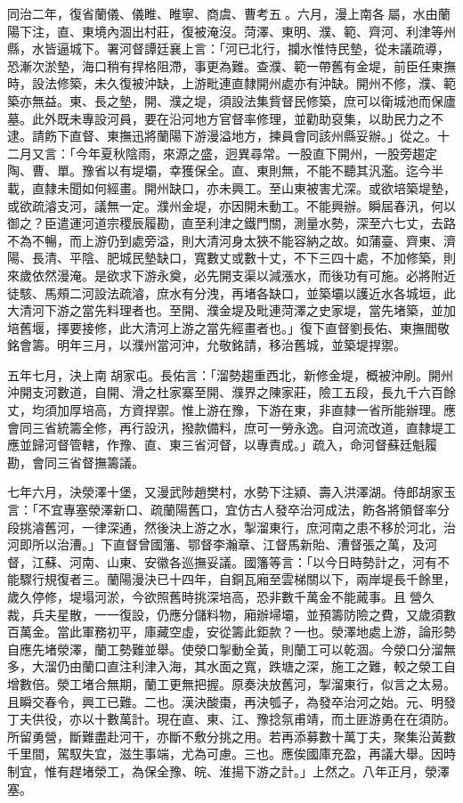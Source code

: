 \begin{pinyinscope}
同治二年，復省蘭儀、儀睢、睢寧、商虞、曹考五。六月，漫上南各屬，水由蘭陽下注，直、東境內涸出村莊，復被淹沒。菏澤、東明、濮、範、齊河、利津等州縣，水皆逼城下。署河督譚廷襄上言：「河已北行，攔水惟恃民墊，從未議疏導，恐漸次淤墊，海口稍有捍格阻滯，事更為難。查濮、範一帶舊有金堤，前臣任東撫時，設法修築，未久復被沖缺，上游毗連直隸開州處亦有沖缺。開州不修，濮、範築亦無益。東、長之墊，開、濮之堤，須設法集貲督民修築，庶可以衛城池而保廬墓。此外既未專設河員，要在沿河地方官督率修理，並勸助裒集，以助民力之不逮。請飭下直督、東撫迅將蘭陽下游漫溢地方，揀員會同該州縣妥辦。」從之。十二月又言：「今年夏秋陰雨，來源之盛，迥異尋常。一股直下開州，一股旁趨定陶、曹、單。豫省以有堤壩，幸獲保全。直、東則無，不能不聽其汎濫。迄今半載，直隸未聞如何經畫。開州缺口，亦未興工。至山東被害尤深。或欲培築堤墊，或欲疏濬支河，議無一定。濮州金堤，亦因開未動工。不能興辦。瞬屆春汛，何以御之？臣遣運河道宗稷辰履勘，直至利津之鐵門關，測量水勢，深至六七丈，去路不為不暢，而上游仍到處旁溢，則大清河身太狹不能容納之故。如蒲臺、齊東、濟陽、長清、平陰、肥城民墊缺口，寬數丈或數十丈，不下三四十處，不加修築，則來歲依然漫淹。是欲求下游永奠，必先開支渠以減漲水，而後功有可施。必將附近徒駭、馬頰二河設法疏濬，庶水有分洩，再堵各缺口，並築壩以護近水各城垣，此大清河下游之當先料理者也。至開、濮金堤及毗連菏澤之史家堤，當先堵築，並加培舊堰，擇要接修，此大清河上游之當先經畫者也。」復下直督劉長佑、東撫閻敬銘會籌。明年三月，以濮州當河沖，允敬銘請，移治舊城，並築堤捍禦。

五年七月，決上南胡家屯。長佑言：「溜勢趨重西北，新修金堤，概被沖刷。開州沖開支河數道，自開、滑之杜家寨至開、濮界之陳家莊，險工五段，長九千六百餘丈，均須加厚培高，方資捍禦。惟上游在豫，下游在東，非直隸一省所能辦理。應會同三省統籌全修，再行設汛，撥款備料，庶可一勞永逸。自河流改道，直隸堤工應並歸河督管轄，作豫、直、東三省河督，以專責成。」疏入，命河督蘇廷魁履勘，會同三省督撫籌議。

七年六月，決滎澤十堡，又漫武陟趙樊村，水勢下注潁、壽入洪澤湖。侍郎胡家玉言：「不宜專塞滎澤新口、疏蘭陽舊口，宜仿古人發卒治河成法，飭各將領督率分段挑濬舊河，一律深通，然後決上游之水，掣溜東行，庶河南之患不移於河北，治河即所以治漕。」下直督曾國籓、鄂督李瀚章、江督馬新貽、漕督張之萬，及河督，江蘇、河南、山東、安徽各巡撫妥議。國籓等言：「以今日時勢計之，河有不能驟行規復者三。蘭陽漫決已十四年，自銅瓦廂至雲梯關以下，兩岸堤長千餘里，歲久停修，堤塌河淤，今欲照舊時挑深培高，恐非數千萬金不能蕆事。且營久裁，兵夫星散，一一復設，仍應分儲料物，廂辦埽壩，並預籌防險之費，又歲須數百萬金。當此軍務初平，庫藏空虛，安從籌此鉅款？一也。滎澤地處上游，論形勢自應先堵滎澤，蘭工勢難並舉。使滎口掣動全黃，則蘭工可以乾涸。今滎口分溜無多，大溜仍由蘭口直注利津入海，其水面之寬，跌塘之深，施工之難，較之滎工自增數倍。滎工堵合無期，蘭工更無把握。原奏決放舊河，掣溜東行，似言之太易。且瞬交春令，興工已難。二也。漢決酸棗，再決瓠子，為發卒治河之始。元、明發丁夫供役，亦以十數萬計。現在直、東、江、豫捻氛甫靖，而土匪游勇在在須防。所留勇營，斷難盡赴河干，亦斷不敷分挑之用。若再添募數十萬丁夫，聚集沿黃數千里間，駕馭失宜，滋生事端，尤為可慮。三也。應俟國庫充盈，再議大舉。因時制宜，惟有趕堵滎工，為保全豫、皖、淮揚下游之計。」上然之。八年正月，滎澤塞。


\end{pinyinscope}
